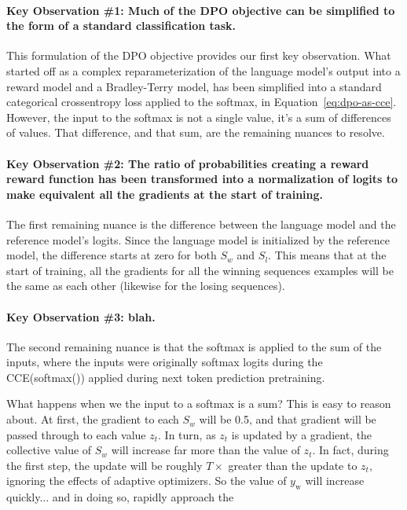\documentclass[twoside,11pt]{article}
\begin{document}
\paragraph{Key Observation \#1: Much of the DPO objective 
can be simplified to the form of a 
standard classification task.} \label{obs:dpo-as-cce}
This formulation of the DPO objective provides our first key observation. 
What started off as a complex reparameterization 
of the language model's output into a reward
model and a Bradley-Terry model, 
has been simplified into a standard 
categorical crossentropy loss applied to the softmax, in
Equation~\ref{eq:dpo-as-cce}. However, the
input to the softmax is not a single value, 
it's a sum of differences of values. That difference, and that
sum, are the remaining nuances to resolve. 

\paragraph{Key Observation \#2: The ratio of probabilities
creating a reward reward function has been transformed into a normalization of 
logits to make equivalent all the gradients at the start of training.} 

The first remaining nuance is the difference between
the language model and the reference model's logits. Since
the language model is initialized by the reference model,
the difference starts at zero for both $S_w$ and $S_l$. 
This means that at the start of training, all the gradients
for all the winning sequences examples will be the same as each other
(likewise for the losing sequences). 

\paragraph{Key Observation \#3: blah.} 
\label{obs:softmax-cce}
The second remaining nuance is that the softmax is applied to
the sum of the inputs, where the inputs were originally
softmax logits during the CCE(softmax()) applied during next
token prediction pretraining. 

What happens when we the input to a softmax is a sum? This is 
easy to reason about. At first, the gradient to each $S_w$ will
be 0.5, and that gradient will be passed through to each
value $z_t$. In turn, as $z_t$ is updated by a gradient, the collective
value of $S_w$ will increase far more than the value of $z_t$. 
In fact, during the first step, the update will be roughly
$T \times$ greater than the update to $z_t$, ignoring the effects 
of adaptive optimizers. So the value of $y_\mathrm{w}$ will increase
quickly... and in doing so, rapidly approach the 
\end{document}
